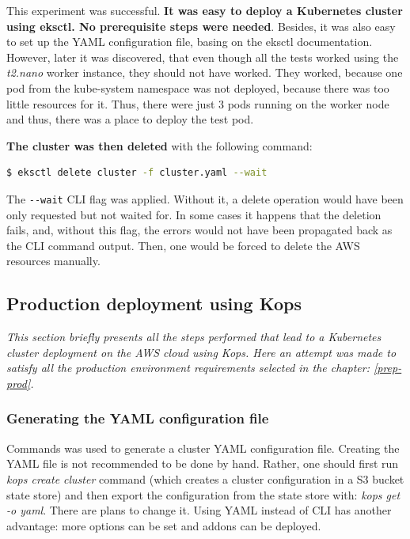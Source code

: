 This experiment was successful. \textbf{It was easy to deploy a Kubernetes cluster using eksctl. No prerequisite steps were needed}. Besides, it was also easy to set up the YAML configuration file, basing on the eksctl documentation\cite{eksctl-creating-clusters}. However, later it was discovered, that even though all the tests worked using the \textit{t2.nano} worker instance, they should not have worked. They worked, because one pod from the kube-system namespace was not deployed, because there was too little resources for it. Thus, there were just 3 pods running on the worker node and thus, there was a place to deploy the test pod.


\textbf{The cluster was then deleted} with the following command:
\begin{lstlisting}[basicstyle=\tiny,caption={Command used to delete Kubernetes cluster with eksctl},captionpos=b,language=Bash,xleftmargin=1cm]
$ eksctl delete cluster -f cluster.yaml --wait
\end{lstlisting}

The \verb|--wait| CLI flag was applied. Without it, a delete operation would have been only requested but not waited for. In some cases it happens that the deletion fails, and, without this flag, the errors would not have been propagated back as the CLI command output. Then, one would be forced to delete the AWS resources manually\cite{eksctl-creating-clusters}.


\subsection{Production deployment using Kops}
\textit{This section briefly presents all the steps performed that lead to a Kubernetes cluster deployment on the AWS cloud using Kops. Here an attempt was made to satisfy all the production environment requirements selected in the chapter: \ref{prep-prod}.}
\\

\subsubsection{Generating the YAML configuration file}
Commands was used to generate a cluster YAML configuration file. Creating the YAML file is not recommended to be done by hand. Rather, one should first run \textit{kops create cluster} command (which creates a cluster configuration in a S3 bucket state store) and then export the configuration from the state store with: \textit{kops get -o yaml}. There are plans to change it. Using YAML instead of CLI has another advantage: more options can be set\cite{online-kops-manifest} and addons can be deployed\cite{online-kops-addons}.

